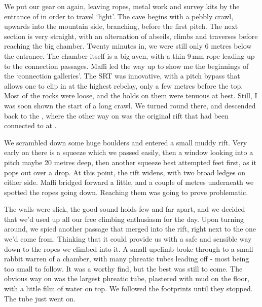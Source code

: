 We put our gear on again, leaving ropes, metal work and survey kits by the entrance of  in order to travel `light'. The cave begins with a pebbly crawl, upwards into the mountain side, branching, before the first pitch. The next section is very straight, with an alternation of abseils, climbs and traverses before reaching the big chamber. Twenty minutes in, we were still only 6 metres below the entrance. The chamber itself is a big aven, with a thin 9\,mm rope leading up to the connection passages. Maffi led the way up to show me the beginnings of the `connection galleries'. The SRT was innovative, with a pitch bypass that allows one to clip in at the highest rebelay, only a few metres before the top. Most of the rocks were loose, and the holds on them were tenuous at best. Still, I was soon shown the start of a long crawl. We turned round there, and descended back to the , where the other way on was the original  rift that had been connected to  at . 

We scrambled down some huge boulders and entered a small muddy rift. Very early on there is a squeeze which we passed easily, then a window looking into a pitch maybe 20 metres deep, then another squeeze best attempted feet first, as it pops out over a drop. At this point, the rift widens, with two broad ledges on either side. Maffi bridged forward a little, and a couple of metres underneath we spotted the ropes going down. Reaching them was going to prove problematic. 

The walls were slick, the good sound holds few and far apart, and we decided that we'd used up all our free climbing enthusiasm for the day. Upon turning around, we spied another passage that merged into the rift, right next to the one we'd come from. Thinking that it could provide us with a safe and sensible way down to the ropes we climbed into it. 
A small upclimb broke through to a small rabbit warren of a chamber, with many phreatic tubes leading off - most being too small to follow. It was a worthy find, but the best was still to come. The obvious way on was the largest phreatic tube, plastered with mud on the floor, with a little film of water on top. We followed the footprints until they stopped. The tube just went on.


